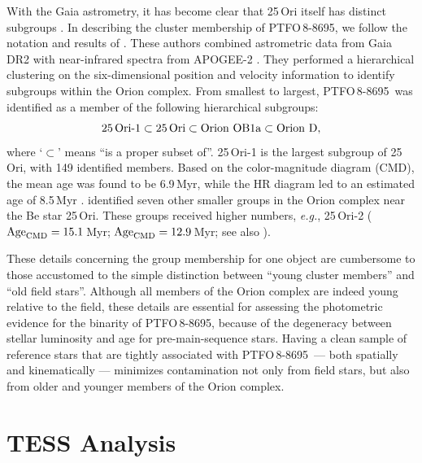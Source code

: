 \documentclass[12pt,twocolumn,tighten]{aastex62}
\newcommand{\ptfo}{PTFO$\,$8-8695}
\begin{document}
With the Gaia astrometry, it has become clear that 25$\,$Ori itself
has distinct subgroups
\citep{kounkel_apogee2_2018,briceno_cidaII_2019}.  In describing the
cluster membership of \ptfo, we follow the notation and results of
\citet{kounkel_apogee2_2018}.  These authors combined astrometric data
from Gaia DR2 with near-infrared spectra from APOGEE-2
\citep{gunn_sdss_2006,majewski_apache_2017,blanton_sloan_2017,zasowski_target_2017,cottle_apogee2_2018}.
They performed a hierarchical clustering on the six-dimensional
position and velocity information to identify subgroups within the
Orion complex.  From smallest to largest, \ptfo\ was identified as a
member of the following hierarchical subgroups:
\begin{equation}
  {\rm 25\,Ori\text{-}1}
  \subset {\rm 25\,Ori}
  \subset {\rm Orion\ OB1a}
  \subset {\rm Orion\ D},
\end{equation}
where `$\subset$' means ``is a proper subset of''.  25$\,$Ori-1 is the
largest subgroup of 25$\,$Ori, with 149 identified members.  Based on
the color-magnitude diagram (CMD), the mean age was found to be
6.9$\,$Myr, while the HR diagram led to an estimated age of 8.5$\,$Myr
\citep[see][Section 2.3]{kounkel_apogee2_2018}.
\citet{kounkel_apogee2_2018} identified seven other smaller groups in
the Orion complex near the Be star 25$\,$Ori. These groups received
higher numbers, {\it e.g.}, 25$\,$Ori-2 (${\rm Age}_{\rm CMD}
=15.1\,$Myr; ${\rm Age}_{\rm CMD} =12.9\,$Myr; see also
\citealt{briceno_cidaII_2019}).

These details concerning the group membership for one object are
cumbersome to those accustomed to the simple distinction between
``young cluster members'' and ``old field stars''.  Although all
members of the Orion complex are indeed young relative to the field,
these details are essential for assessing the photometric evidence for
the binarity of \ptfo, because of the degeneracy between stellar
luminosity and age for pre-main-sequence stars.  Having a clean sample
of reference stars that are tightly associated with \ptfo\ --- both
spatially and kinematically --- minimizes contamination not only from
field stars, but also from older and younger members of the Orion
complex.


\section{TESS Analysis}
\label{sec:tess}
\end{document}
